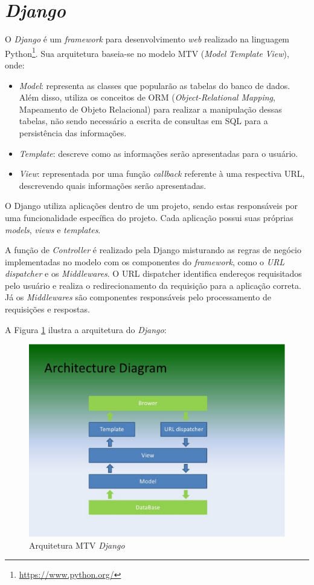 \section{\textit{Django}}
O \textit{Django} é um \textit{framework} para desenvolvimento \textit{web} realizado na linguagem Python\footnote{\url{https://www.python.org/}}. Sua arquitetura baseia-se no modelo MTV (\textit{Model} \textit{Template} \textit{View}), onde:
\begin{itemize}
    \item \textit{Model}: representa as classes que popularão as tabelas do banco de dados. Além disso, utiliza os conceitos de ORM (\textit{Object-Relational Mapping}, Mapeamento de Objeto Relacional) para realizar a manipulação dessas tabelas, não sendo necessário a escrita de consultas em SQL para a persistência das informações.
    \item \textit{Template}: descreve como as informações serão apresentadas para o usuário.
    \item \textit{View}: representada por uma função \textit{callback} referente à uma respectiva URL, descrevendo quais informações serão apresentadas.
\end{itemize}

O Django utiliza aplicações dentro de um projeto, sendo estas responsáveis por uma funcionalidade específica do projeto. Cada aplicação possui suas próprias \textit{models}, \textit{views} e \textit{templates}.

A função de \textit{Controller} é realizado pela Django misturando as regras de negócio implementadas no modelo com os componentes do \textit{framework}, como o \textit{URL dispatcher} e os \textit{Middlewares}. O URL dispatcher identifica endereços requisitados pelo usuário e realiza o redirecionamento da requisição para a aplicação correta. Já os \textit{Middlewares} são componentes responsáveis pelo processamento de requisições e respostas.

A Figura \ref{django-arq} ilustra a arquitetura do \textit{Django}:

\begin{figure}[h]
    \centering
    \includegraphics[keepaspectratio=true,scale=0.5]{figuras/django-arquitetura.eps}
    \caption{Arquitetura MTV \textit{Django}}
    \label{django-arq}
\end{figure}

